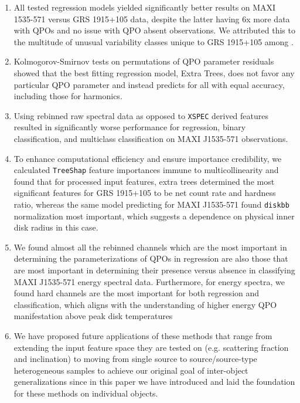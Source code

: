 \documentclass[fleqn,usenatbib,twocolumn]{mnras}%
\begin{document}
\begin{enumerate}
    \item All tested regression models yielded significantly better results on MAXI 1535-571 versus GRS 1915+105 data, despite the latter having 6x more data with QPOs and no issue with QPO absent observations. We attributed this to the multitude of unusual variability classes unique to GRS 1915+105 among \cite{MLStatesofGRS}.
    \item Kolmogorov-Smirnov tests on permutations of QPO parameter residuals showed that the best fitting regression model, Extra Trees, does not favor any particular QPO parameter and instead predicts for all with equal accuracy, including those for harmonics.
    \item Using rebinned raw spectral data as opposed to \texttt{XSPEC} derived features resulted in significantly worse performance for regression, binary classification, and multiclass classification on MAXI J1535-571 observations. 
    \item To enhance computational efficiency and ensure importance credibility, we calculated \texttt{TreeShap} feature importances immune to multicollinearity and found that for processed input features, extra trees determined the most significant features for GRS 1915+105 to be net count rate and hardness ratio, whereas the same model predicting for MAXI J1535-571 found \texttt{diskbb} normalization most important, which suggests a dependence on physical inner disk radius in this case. 
    \item We found almost all the rebinned channels which are the most important in determining the parameterizations of QPOs in regression are also those that are most important in determining their presence versus absence in classifying MAXI J1535-571 energy spectral data. Furthermore, for energy spectra, we found hard channels are the most important for both regression and classification, which aligns with the understanding of higher energy QPO manifestation above peak disk temperatures
    \item We have proposed future applications of these methods that range from extending the input feature space they are tested on (e.g. scattering fraction and inclination) to moving from single source to source/source-type heterogeneous samples to achieve our original goal of inter-object generalizations since in this paper we have introduced and laid the foundation for these methods on individual objects. 
\end{enumerate}
\end{document}
